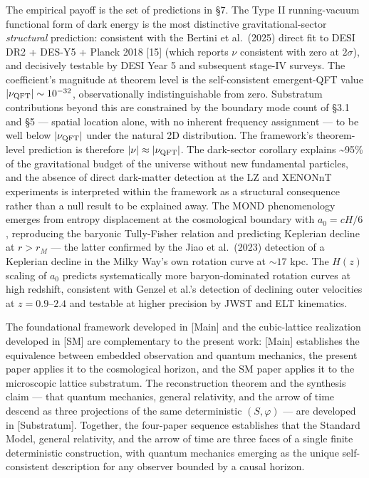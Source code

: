 \documentclass[
]{article}
\begin{document}
The empirical payoff is the set of predictions in §7. The Type II
running-vacuum functional form of dark energy is the most distinctive
gravitational-sector \emph{structural} prediction: consistent with the
Bertini et al.~(2025) direct fit to DESI DR2 + DES-Y5 + Planck 2018
{[}15{]} (which reports \(\nu\) consistent with zero at \(2\sigma\)),
and decisively testable by DESI Year 5 and subsequent stage-IV surveys.
The coefficient's magnitude at theorem level is the self-consistent
emergent-QFT value \(|\nu_{\rm QFT}| \sim 10^{-32}\), observationally
indistinguishable from zero. Substratum contributions beyond this are
constrained by the boundary mode count of §3.1 and §5 --- spatial
location alone, with no inherent frequency assignment --- to be well
below \(|\nu_{\rm QFT}|\) under the natural 2D distribution. The
framework's theorem-level prediction is therefore
\(|\nu| \approx |\nu_{\rm QFT}|\). The dark-sector corollary explains
\textasciitilde95\% of the gravitational budget of the universe without
new fundamental particles, and the absence of direct dark-matter
detection at the LZ and XENONnT experiments is interpreted within the
framework as a structural consequence rather than a null result to be
explained away. The MOND phenomenology emerges from entropy displacement
at the cosmological boundary with \(a_0 = cH/6\), reproducing the
baryonic Tully-Fisher relation and predicting Keplerian decline at
\(r > r_M\) --- the latter confirmed by the Jiao et al.~(2023) detection
of a Keplerian decline in the Milky Way's own rotation curve at
\(\sim 17\) kpc. The \(H(z)\) scaling of \(a_0\) predicts systematically
more baryon-dominated rotation curves at high redshift, consistent with
Genzel et al.'s detection of declining outer velocities at
\(z = 0.9\)--\(2.4\) and testable at higher precision by JWST and ELT
kinematics.

The foundational framework developed in {[}Main{]} and the cubic-lattice
realization developed in {[}SM{]} are complementary to the present work:
{[}Main{]} establishes the equivalence between embedded observation and
quantum mechanics, the present paper applies it to the cosmological
horizon, and the SM paper applies it to the microscopic lattice
substratum. The reconstruction theorem and the synthesis claim --- that
quantum mechanics, general relativity, and the arrow of time descend as
three projections of the same deterministic \((S, \varphi)\) --- are
developed in {[}Substratum{]}. Together, the four-paper sequence
establishes that the Standard Model, general relativity, and the arrow
of time are three faces of a single finite deterministic construction,
with quantum mechanics emerging as the unique self-consistent
description for any observer bounded by a causal horizon.
\end{document}
